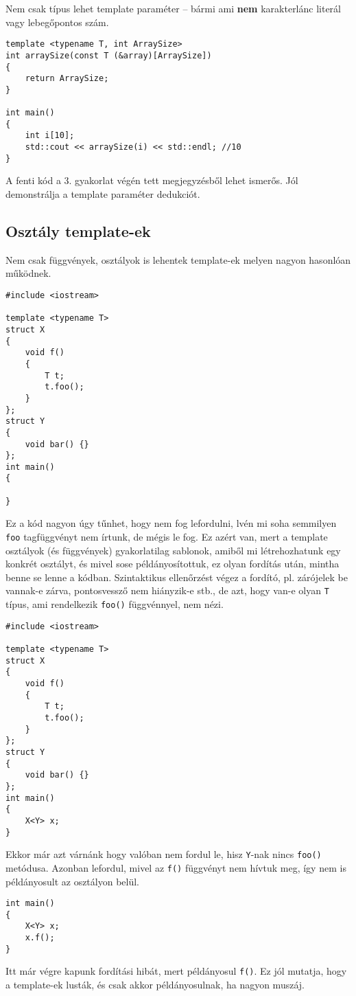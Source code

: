 \documentclass[a4paper,11.5pt,table]{article}
\begin{document}
	\medskip
	Nem csak típus lehet template paraméter -- bármi ami \textbf{nem} karakterlánc literál vagy lebegőpontos szám.
	\begin{lstlisting}
template <typename T, int ArraySize>
int arraySize(const T (&array)[ArraySize])
{
	return ArraySize;
}

int main()
{
	int i[10];
	std::cout << arraySize(i) << std::endl; //10
}
	\end{lstlisting}
	A fenti kód a 3. gyakorlat végén tett megjegyzésből lehet ismerős. Jól demonstrálja a template paraméter dedukciót.
	\subsection{Osztály template-ek}
	Nem csak függvények, osztályok is lehentek template-ek melyen nagyon hasonlóan működnek.
	\begin{lstlisting}
#include <iostream>

template <typename T>
struct X
{
	void f()
	{
		T t;
		t.foo();
	}
};
struct Y
{
	void bar() {}
};
int main()
{
	
}
	\end{lstlisting}
	Ez a kód nagyon úgy tűnhet, hogy nem fog lefordulni, lvén mi soha semmilyen \texttt{foo} tagfüggvényt nem írtunk, de mégis le fog. Ez azért van, mert a template osztályok (és függvények) gyakorlatilag sablonok, amiből mi létrehozhatunk egy konkrét osztályt, és mivel sose példányosítottuk, ez olyan fordítás után, mintha benne se lenne a kódban. Szintaktikus ellenőrzést végez a fordító, pl. zárójelek be vannak-e zárva, pontosvessző nem hiányzik-e stb., de azt, hogy van-e olyan \texttt{T} típus, ami rendelkezik \texttt{foo()} függvénnyel, nem nézi.
\begin{lstlisting}
#include <iostream>

template <typename T>
struct X
{
	void f()
	{
		T t;
		t.foo();
	}
};
struct Y
{
	void bar() {}
};
int main()
{
	X<Y> x;
}
\end{lstlisting}
	Ekkor már azt várnánk hogy valóban nem fordul le, hisz \texttt{Y}-nak nincs \texttt{foo()} metódusa. Azonban lefordul, mivel az \texttt{f()} függvényt nem hívtuk meg, így nem is példányosult az osztályon belül.
	\begin{lstlisting}
int main()
{
	X<Y> x;
	x.f();
}
	\end{lstlisting}
	Itt már végre kapunk fordítási hibát, mert példányosul \texttt{f()}. Ez jól mutatja, hogy a template-ek lusták, és csak akkor példányosulnak, ha nagyon muszáj.
	\medskip
	
\end{document}

